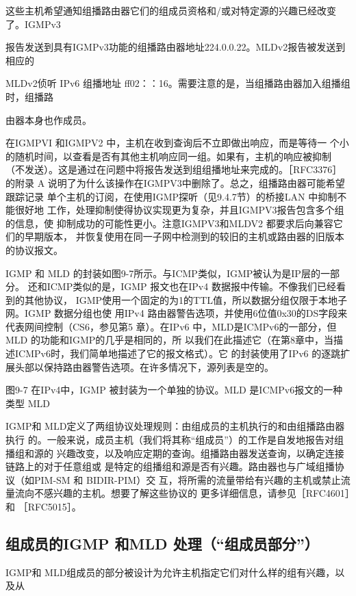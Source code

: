 这些主机希望通知组播路由器它们的组成员资格和/或对特定源的兴趣已经改变了。IGMPv3

报告发送到具有IGMPv3功能的组播路由器地址224.0.0.22。MLDv2报告被发送到相应的

MLDv2侦听 IPv6 组播地址 ff02：：16。需要注意的是，当组播路由器加入组播组时，组播路

由器本身也作成员。


\begin{tcolorbox}
    在IGMPVI 和IGMPV2 中，主机在收到查询后不立即做出响应，而是等待一
    个小的随机时间，以查看是否有其他主机响应同一组。如果有，主机的响应被抑制
    （不发送）。这是通过在问题中将报告发送到组组播地址来完成的。［RFC3376］的附录
    A 说明了为什么该操作在IGMPV3中删除了。总之，组播路由器可能希望跟踪记录
    单个主机的订阅，在使用IGMP探听（见9.4.7节）的桥接LAN 中抑制不能很好地
    工作，处理抑制使得协议实现更为复杂，并且IGMPV3报告包含多个组的信息，使
    抑制成功的可能性更小。注意IGMPV3和MLDV2 都要求后向兼容它们的早期版本，
    并恢复使用在同一子网中检测到的较旧的主机或路由器的旧版本的协议报文。
\end{tcolorbox}

IGMP 和 MLD 的封装如图9-7所示。与ICMP类似，IGMP被认为是IP层的一部分。
还和ICMP类似的是，IGMP 报文也在IPv4 数据报中传输。不像我们已经看到的其他协议，
IGMP使用一个固定的为1的TTL值，所以数据分组仅限于本地子网。IGMP 数据分组也使
用IPv4 路由器警告选项，并使用6位值0x30的DS字段来代表网间控制（CS6，参见第5
章）。在IPv6 中，MLD是ICMPv6的一部分，但 MLD 的功能和IGMP的几乎是相同的，所
以我们在此描述它（在第8章中，当描述ICMPv6时，我们简单地描述了它的报文格式）。它
的封装使用了IPv6 的逐跳扩展头部以保持路由器警告选项。在许多情况下，源列表是空的。

图9-7 在IPv4中，IGMP 被封装为一个单独的协议。MLD 是ICMPv6报文的一种类型
MLD


IGMP和 MLD定义了两组协议处理规则：由组成员的主机执行的和由组播路由器执行
的。一般来说，成员主机（我们将其称“组成员”）的工作是自发地报告对组播组和源的
兴趣改变，以及响应定期的查询。组播路由器发送查询，以确定连接链路上的对于任意组或
是特定的组播组和源是否有兴趣。路由器也与广域组播协议（如PIM-SM 和 BIDIR-PIM）交
互，将所需的流量带给有兴趣的主机或禁止流量流向不感兴趣的主机。想要了解这些协议的
更多详细信息，请参见［RFC4601］和 ［RFC5015］。

\subsection{组成员的IGMP 和MLD 处理（“组成员部分”）}
IGMP和 MLD组成员的部分被设计为允许主机指定它们对什么样的组有兴趣，以及从

